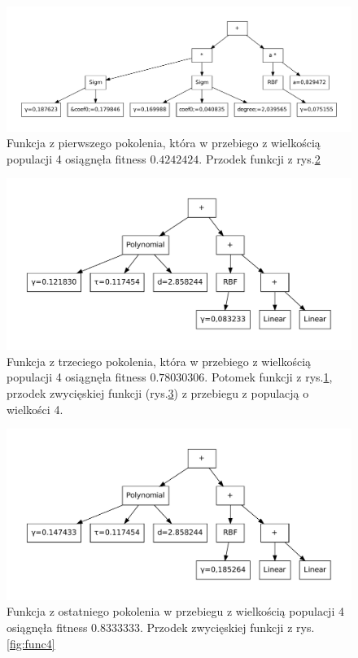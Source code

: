 	     \begin{figure}
		\includegraphics[scale=0.50]{figures/functions/func1}
		\caption{Funkcja z pierwszego pokolenia, która w przebiego z wielkością populacji 4 osiągnęła fitness $0.4242424$. Przodek funkcji z rys.\ref{fig:func2} \label{fig:func1}}
	\end{figure}
	
	\begin{figure}
		\includegraphics[scale=0.60]{figures/functions/func2}
		\caption{Funkcja z trzeciego pokolenia, która w przebiego z wielkością populacji 4 osiągnęła fitness $0.78030306$. Potomek funkcji z rys.\ref{fig:func1}, przodek zwycięskiej funkcji (rys.\ref{fig:func5}) z przebiegu z populacją o wielkości 4.\label{fig:func2}}
	\end{figure}
          
   	\begin{figure}
		\includegraphics[scale=0.60]{figures/functions/func5}
		\caption{Funkcja z ostatniego pokolenia w przebiegu z wielkością populacji 4 osiągnęła fitness $0.8333333$. Przodek zwycięskiej funkcji z rys.\ref{fig:func4} \label{fig:func5}}
	\end{figure}          


